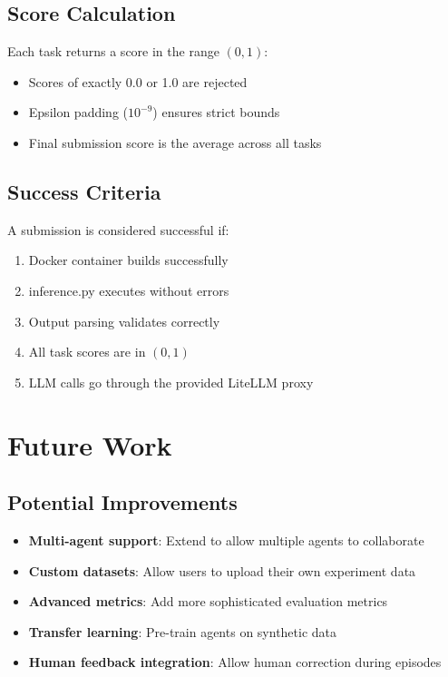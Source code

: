 \documentclass[12pt,a4paper]{article}
\begin{document}
\subsection{Score Calculation}

Each task returns a score in the range $(0, 1)$:

\begin{itemize}
	\item Scores of exactly 0.0 or 1.0 are rejected
	\item Epsilon padding ($10^{-9}$) ensures strict bounds
	\item Final submission score is the average across all tasks
\end{itemize}

\subsection{Success Criteria}

A submission is considered successful if:
\begin{enumerate}
	\item Docker container builds successfully
	\item inference.py executes without errors
	\item Output parsing validates correctly
	\item All task scores are in $(0, 1)$
	\item LLM calls go through the provided LiteLLM proxy
\end{enumerate}

\section{Future Work}

\subsection{Potential Improvements}

\begin{itemize}
	\item \textbf{Multi-agent support}: Extend to allow multiple agents to collaborate
	\item \textbf{Custom datasets}: Allow users to upload their own experiment data
	\item \textbf{Advanced metrics}: Add more sophisticated evaluation metrics
	\item \textbf{Transfer learning}: Pre-train agents on synthetic data
	\item \textbf{Human feedback integration}: Allow human correction during episodes
\end{itemize}
\end{document}
